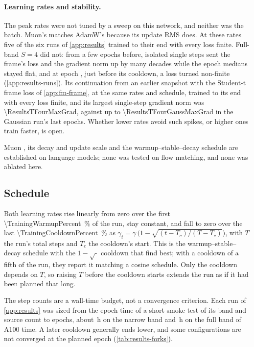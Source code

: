 \paragraph{Learning rates and stability.}
The peak rates were not tuned by a sweep on this network, and neither was the batch. Muon's matches
AdamW's because its update RMS does. At these rates five of the six runs of \cref{app:results}
trained to their end with every loss finite. Full-band $S=4$ did not: from a few epochs before,
isolated single steps sent the frame's loss and the gradient norm up by many decades while the
epoch medians stayed flat, and at epoch \ResultsFullFourDivergedEpoch, just before its cooldown, a
loss turned non-finite (\cref{app:results-runs}). Its continuation from an earlier snapshot with the
Student-t frame loss of \cref{app:fm-frame}, at the same rates and schedule, trained to its end with
every loss finite, and its largest single-step gradient norm was \num{\ResultsTFourMaxGrad},
against up to \num{\ResultsTFourGaussMaxGrad} in the Gaussian run's last epochs. Whether lower
rates avoid such spikes, or higher ones train faster, is open.

Muon \citep{jordan2024muon}, its decay and update scale \citep{liu2025muon} and the
warmup--stable--decay schedule \citep{hu2024minicpm,hagele2024scaling} are established on language
models; none was tested on flow matching, and none was ablated here.

\subsection{Schedule}
\label{app:training-schedules}

Both learning rates rise linearly from zero over the first \qty{\TrainingWarmupPercent}{\percent} of
the run, stay constant, and fall to zero over the last \qty{\TrainingCooldownPercent}{\percent} as
$\gamma_t = \gamma\,\bigl(1 - \sqrt{(t - T_c)/(T - T_c)}\bigr)$, with $T$ the run's total steps and
$T_c$ the cooldown's start. This is the warmup--stable--decay schedule \citep{hu2024minicpm} with
the $1-\sqrt{\cdot}$ cooldown that \citet{hagele2024scaling} find best; with a cooldown of a fifth
of the run, they report it matching a cosine schedule. Only the cooldown depends on $T$, so raising
$T$ before the cooldown starts extends the run as if it had been planned that long.

The step counts are a wall-time budget, not a convergence criterion. Each run of \cref{app:results}
was sized from the epoch time of a short smoke test of its band and source count to
\ResultsEpochs{} epochs, about \ResultsNarrowHours\,h on the narrow band and \ResultsFullHours\,h on
the full band of A100 time. A later cooldown generally ends lower, and some configurations are not
converged at the planned epoch (\cref{tab:results-forks}).

